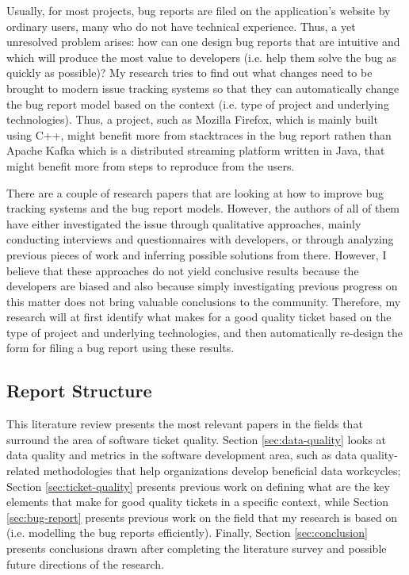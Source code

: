 \documentclass[11pt,english,twocolumn]{article}
\begin{document}
Usually, for most projects, bug reports are filed on the application's website by ordinary users, many
who do not have technical experience. Thus, a yet unresolved problem arises: how can one
design bug reports that are intuitive and which will produce the most value to developers 
(i.e. help them solve the bug as quickly as possible)? My research tries to find out
what changes need to be brought to modern issue tracking systems so that they can automatically
change the bug report model based on the context (i.e. type of project and underlying technologies).
Thus, a project, such as Mozilla Firefox, which is mainly built using C++, might benefit more from
stacktraces in the bug report rathen than Apache Kafka which is a distributed streaming platform written
in Java, that might benefit more from steps to reproduce from the users.

There are a couple of research papers that are looking at how to improve bug tracking
systems and the bug report models. However, the authors of all of them have either investigated the issue through
qualitative approaches, mainly conducting interviews and questionnaires with developers,
or through analyzing previous pieces of work and inferring possible solutions from there. However,
I believe that these approaches do not yield conclusive results because the developers are biased and
also because simply investigating previous progress on this matter does not bring valuable 
conclusions to the community. Therefore, my research will at first identify what makes for a 
good quality ticket based on the type of project and underlying technologies, and then automatically
re-design the form for filing a bug report using these results.

\subsection*{Report Structure}
\label{sec:label-subsection}

This literature review presents the most relevant papers in the fields that surround the
area of software ticket quality. Section \ref{sec:data-quality} looks at data quality and 
metrics in the software development area, such as data quality-related methodologies that 
help organizations develop beneficial data workcycles; Section \ref{sec:ticket-quality} presents 
previous work on defining what are the key elements that make for good quality tickets
in a specific context, while Section \ref{sec:bug-report} presents previous work on
the field that my research is based on (i.e. modelling the bug reports efficiently).
Finally, Section \ref{sec:conclusion} presents conclusions drawn after completing the 
literature survey and possible future directions of the research.
\end{document}
